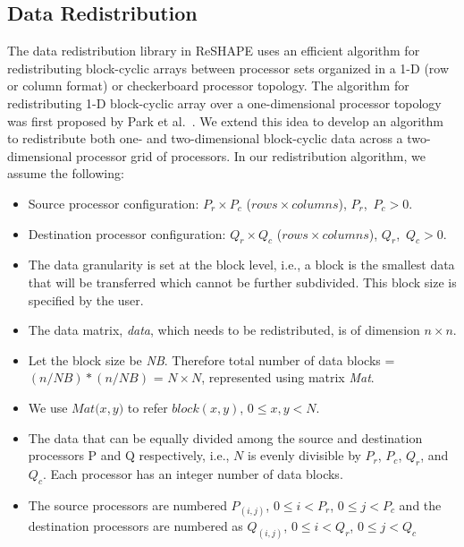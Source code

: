 \documentclass[letterpaper]{llncs}
\begin{document}
\subsection{Data Redistribution}
\label{subsec:Dataredist}
The data redistribution library in ReSHAPE uses an efficient algorithm for redistributing block-cyclic  arrays between processor sets organized in a 1-D (row or column format) or checkerboard processor topology. 
The algorithm for redistributing 1-D block-cyclic array over a one-dimensional processor topology was first proposed by Park et al.~\cite{park}. 
We extend this idea to develop an algorithm to redistribute both one- and two-dimensional block-cyclic data 
across a two-dimensional processor grid of processors.
In our redistribution algorithm, we assume the following:
\begin{itemize}
\item 	Source processor configuration: $P_{r} \times P_{c}$ ($rows \times columns$), $P_r$,\, $P_c > 0$.
\item 	Destination processor configuration: $Q_{r} \times Q_{c}$ ($rows \times columns$), $Q_r$,\, $Q_c > 0$.
\item 	The data granularity is set at the block level, i.e., a block is the smallest data that will be transferred which cannot be further subdivided. 
        This block size is specified by the user.
\item 	The data matrix, \textit{data}, which needs to be redistributed, is of dimension $n \times n$.
\item 	Let the block size be \textit{NB}. Therefore total number of data blocks = $(n/NB)\ast (n/NB)$
      = $N \times N$, represented using matrix \textit{Mat}.
\item 	We use $Mat(x$,$\,y)$ to refer $block(x,y)$, $0 \leq x, y < N$.
\item   The data that can be equally divided among the source and destination processors P and Q respectively,
        i.e., $N$ is evenly divisible by $P_{r}$, $P_{c}$, $Q_{r}$, and $Q_{c}$. Each processor has an integer number of data blocks.
\item The source processors are numbered $P_{(i,j)}$, $0 \leq i < P_r$, $0 \leq j< P_c$ and the destination processors are numbered as $Q_{(i,j)}$, $0 \leq i < Q_r$, $0 \leq j<Q_c$
\end{itemize}
\end{document}
